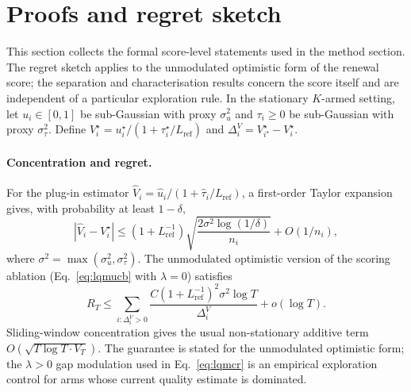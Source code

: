 \documentclass[11pt]{article}
\begin{document}
\section{Proofs and regret sketch}
\label{app:regret}

This section collects the formal score-level statements used in the method section. The regret sketch applies to the unmodulated optimistic form of the renewal score; the separation and characterisation results concern the score itself and are independent of a particular exploration rule. In the stationary $K$-armed setting, let $u_i\in[0,1]$ be sub-Gaussian with proxy $\sigma_u^2$ and $\tau_i\ge0$ be sub-Gaussian with proxy $\sigma_\tau^2$. Define $V_i^\star=u_i^\star/(1+\tau_i^\star/L_{\text{ref}})$ and $\Delta_i^V=V_{i^\star}^\star-V_i^\star$.

\paragraph{Concentration and regret.} For the plug-in estimator $\hat V_i=\hat u_i/(1+\hat\tau_i/L_{\text{ref}})$, a first-order Taylor expansion gives, with probability at least $1-\delta$,
\[
  |\hat V_i-V_i^\star| \le
  (1+L_{\text{ref}}^{-1})
  \sqrt{\frac{2\sigma^2\log(1/\delta)}{n_i}}+O(1/n_i),
\]
where $\sigma^2=\max(\sigma_u^2,\sigma_\tau^2)$. The unmodulated optimistic version of the scoring ablation (Eq.~\ref{eq:lqmucb} with $\lambda=0$) satisfies
\[
  R_T \le \sum_{i:\Delta_i^V>0}
  \frac{C(1+L_{\text{ref}}^{-1})^2\sigma^2\log T}{\Delta_i^V}
  +o(\log T).
\]
Sliding-window concentration gives the usual non-stationary additive term $O(\sqrt{T\log T\cdot V_T})$. The guarantee is stated for the unmodulated optimistic form; the $\lambda>0$ gap modulation used in Eq.~\ref{eq:lqmcr} is an empirical exploration control for arms whose current quality estimate is dominated.
\end{document}
